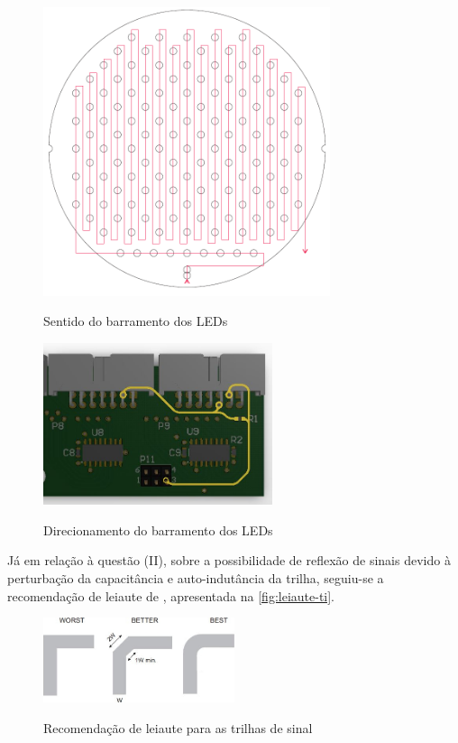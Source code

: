\begin{figure}[H]
    \centering
    \caption{Sentido do barramento dos LEDs}
    \includegraphics[width=0.75\textwidth]{./dados/figuras/sentido-leds}
    \label{fig:sentido-leds}
\end{figure}

\begin{figure}[H]
    \centering
    \caption{Direcionamento do barramento dos LEDs}
    \includegraphics[width=0.6\textwidth]{./dados/figuras/dir-leds}
    \label{fig:direcionamento-leds}
\end{figure}

Já em relação à questão (II), sobre a possibilidade de reflexão de sinais devido à perturbação da capacitância e auto-indutância da trilha, seguiu-se a recomendação de leiaute de \cite{datasheet-ti}, apresentada na \autoref{fig:leiaute-ti}.

\begin{figure}[H]
    \centering
    \caption{Recomendação de leiaute para as trilhas de sinal}
    \includegraphics[width=0.5\textwidth]{./dados/figuras/leiaute-ti}
    \label{fig:leiaute-ti}
\end{figure}

